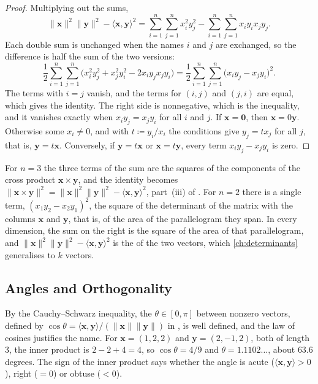 \begin{proof}
Multiplying out the sums,
\[
\|\mathbf x\|^2\|\mathbf y\|^2-\langle\mathbf x,\mathbf y\rangle^2=\sum_{i=1}^n\sum_{j=1}^nx_i^2y_j^2-\sum_{i=1}^n\sum_{j=1}^nx_iy_ix_jy_j .
\]
Each double sum is unchanged when the names $i$ and $j$ are exchanged, so the difference is half the sum of the two versions:
\[
\frac12\sum_{i=1}^n\sum_{j=1}^n\bigl(x_i^2y_j^2+x_j^2y_i^2-2x_iy_jx_jy_i\bigr)=\frac12\sum_{i=1}^n\sum_{j=1}^n\bigl(x_iy_j-x_jy_i\bigr)^2 .
\]
The terms with $i=j$ vanish, and the terms for $(i,j)$ and $(j,i)$ are equal, which gives the identity. The right side is nonnegative, which is the inequality, and it vanishes exactly when $x_iy_j=x_jy_i$ for all $i$ and $j$. If $\mathbf x=\mathbf 0$, then $\mathbf x=0\mathbf y$. Otherwise some $x_i\ne0$, and with $t\coloneqq y_i/x_i$ the conditions give $y_j=tx_j$ for all $j$, that is, $\mathbf y=t\mathbf x$. Conversely, if $\mathbf y=t\mathbf x$ or $\mathbf x=t\mathbf y$, every term $x_iy_j-x_jy_i$ is zero.
\end{proof}

For $n=3$ the three terms of the sum are the squares of the components of the cross product $\mathbf x\times\mathbf y$, and the identity becomes $\|\mathbf x\times\mathbf y\|^2=\|\mathbf x\|^2\|\mathbf y\|^2-\langle\mathbf x,\mathbf y\rangle^2$, part~(iii) of . For $n=2$ there is a single term, $(x_1y_2-x_2y_1)^2$, the square of the determinant of the matrix with the columns $\mathbf x$ and $\mathbf y$, that is, of the area of the parallelogram they span. In every dimension, the sum on the right is the square of the area of that parallelogram, and $\|\mathbf x\|^2\|\mathbf y\|^2-\langle\mathbf x,\mathbf y\rangle^2$ is the  of the two vectors, which \cref{ch:determinants} generalises to $k$ vectors.

\subsection{Angles and Orthogonality}

By the Cauchy--Schwarz inequality, the  $\theta\in[0,\pi]$ between nonzero vectors, defined by $\cos\theta=\langle\mathbf x,\mathbf y\rangle/(\|\mathbf x\|\|\mathbf y\|)$ in , is well defined, and the law of cosines justifies the name. For $\mathbf x=(1,2,2)$ and $\mathbf y=(2,-1,2)$, both of length $3$, the inner product is $2-2+4=4$, so $\cos\theta=4/9$ and $\theta=1.1102\ldots$, about $63.6$ degrees. The sign of the inner product says whether the angle is acute ($\langle\mathbf x,\mathbf y\rangle>0$), right ($=0$) or obtuse ($<0$).

